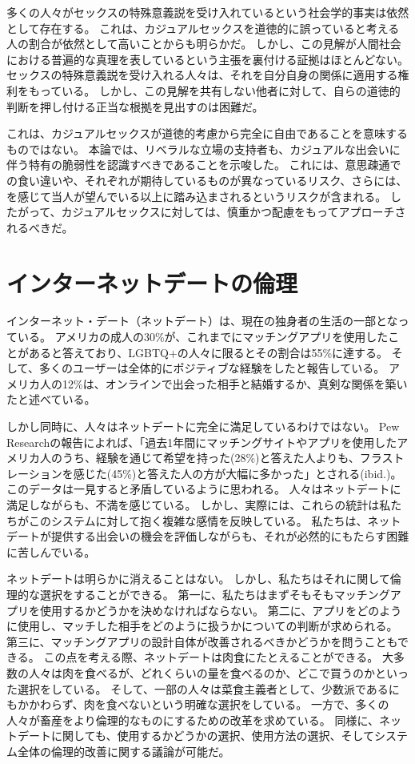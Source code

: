\documentclass[paper=a4,book,openany]{jlreq}
\newcommand{\ig}[1]{}           %
\begin{document}
多くの人々がセックスの特殊意義説を受け入れているという社会学的事実は依然として存在する。
これは、カジュアルセックスを道徳的に誤っていると考える人の割合が依然として高いことからも明らかだ。
しかし、この見解が人間社会における普遍的な真理を表しているという主張を裏付ける証拠はほとんどない。
セックスの特殊意義説を受け入れる人々は、それを自分自身の関係に適用する権利をもっている。
しかし、この見解を共有しない他者に対して、自らの道徳的判断を押し付ける正当な根拠を見出すのは困難だ。

これは、カジュアルセックスが道徳的考慮から完全に自由であることを意味するものではない。
本論では、リベラルな立場の支持者も、カジュアルな出会いに伴う特有の脆弱性を認識すべきであることを示唆した。
これには、意思疎通での食い違いや、それぞれが期待しているものが異なっているリスク、さらには、を感じて当人が望んでいる以上に踏み込まされるというリスクが含まれる。
したがって、カジュアルセックスに対しては、慎重かつ配慮をもってアプローチされるべきだ。

\section{インターネットデートの倫理}

インターネット・デート（ネットデート）は、現在の独身者の生活の一部となっている。
アメリカの成人の30\%が、これまでにマッチングアプリを使用したことがあると答えており、LGBTQ+の人々に限るとその割合は55\%に達する。
そして、多くのユーザーは全体的にポジティブな経験をしたと報告している。
アメリカ人の12\%は、オンラインで出会った相手と結婚するか、真剣な関係を築いたと述べている\citep{anderson20:_virt_down_onlin_datin}。
\ig{Monica Anderson}

しかし同時に、人々はネットデートに完全に満足しているわけではない。
Pew Researchの報告によれば、「過去1年間にマッチングサイトやアプリを使用したアメリカ人のうち、経験を通じて希望を持った(28\%)と答えた人よりも、フラストレーションを感じた(45\%)と答えた人の方が大幅に多かった」とされる(ibid.)。
このデータは一見すると矛盾しているように思われる。
人々はネットデートに満足しながらも、不満を感じている。
しかし、実際には、これらの統計は私たちがこのシステムに対して抱く複雑な感情を反映している。
私たちは、ネットデートが提供する出会いの機会を評価しながらも、それが必然的にもたらす困難に苦しんでいる。

ネットデートは明らかに消えることはない。
しかし、私たちはそれに関して倫理的な選択をすることができる。
第一に、私たちはまずそもそもマッチングアプリを使用するかどうかを決めなければならない。
第二に、アプリをどのように使用し、マッチした相手をどのように扱うかについての判断が求められる。
第三に、マッチングアプリの設計自体が改善されるべきかどうかを問うこともできる。
この点を考える際、ネットデートは肉食にたとえることができる。
大多数の人々は肉を食べるが、どれくらいの量を食べるのか、どこで買うのかといった選択をしている。
そして、一部の人々は菜食主義者として、少数派であるにもかかわらず、肉を食べないという明確な選択をしている。
一方で、多くの人々が畜産をより倫理的なものにするための改革を求めている。
同様に、ネットデートに関しても、使用するかどうかの選択、使用方法の選択、そしてシステム全体の倫理的改善に関する議論が可能だ。
\end{document}
